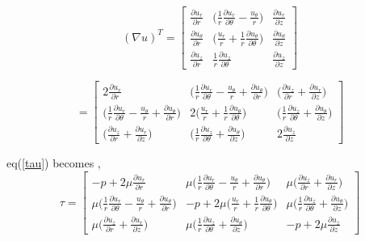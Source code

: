 \documentclass{article}
\begin{document}
\begin{equation}
\label{nablautrans}
(\nabla u)^T =
\begin{bmatrix} 
\frac{\partial u_{r}}{\partial r}   & \bigg(\frac{1}{r}\frac{\partial u_{r}}{\partial \theta} -\frac{u_{\theta}}{r}\bigg) &   \frac{\partial u_{r}}{\partial z}\\
\frac{\partial u_{\theta}}{\partial r} & \bigg(\frac{u_{r}}{r}+\frac{1}{r}\frac{\partial u_{\theta}}{\partial \theta}\bigg)  &       \frac{\partial u_{\theta}}{\partial z}  \\
\frac{\partial u_{z}}{\partial r} & \frac{1}{r}\frac{\partial u_{z}}{\partial \theta}  & \frac{\partial u_{z}}{\partial z}
\end{bmatrix}
\end{equation}

\begin{equation}
[\nabla u + (\nabla u)^T] =
\begin{bmatrix}
2\frac{\partial u_{r}}{\partial r}   &  \bigg(\frac{1}{r}\frac{\partial u_{r}}{\partial \theta} -\frac{u_{\theta}}{r}+\frac{\partial u_{\theta}}{\partial r}\bigg) & \bigg(\frac{\partial u_{z}}{\partial r} + \frac{\partial u_{r}}{\partial z}\bigg) \\
\bigg(\frac{1}{r}\frac{\partial u_{r}}{\partial \theta} -\frac{u_{\theta}}{r}+\frac{\partial u_{\theta}}{\partial r}\bigg) & 2\bigg(\frac{u_{r}}{r}+\frac{1}{r}\frac{\partial u_{\theta}}{\partial \theta}\bigg)  & \bigg(\frac{1}{r}\frac{\partial u_{z}}{\partial \theta} + \frac{\partial u_{\theta}}{\partial z}\bigg) \\
\bigg(\frac{\partial u_{z}}{\partial r} + \frac{\partial u_{r}}{\partial z}\bigg) &  \bigg(\frac{1}{r}\frac{\partial u_{z}}{\partial \theta} + \frac{\partial u_{\theta}}{\partial z}\bigg) & 2\frac{\partial u_{z}}{\partial z}
\end{bmatrix} 
\end{equation}

\therefore eq(\ref{tau}) becomes ,
\begin{equation}
\tau =
\begin{bmatrix}
-p + 2\mu \frac{\partial u_{r}}{\partial r}   &  \mu \bigg(\frac{1}{r}\frac{\partial u_{r}}{\partial \theta} -\frac{u_{\theta}}{r}+\frac{\partial u_{\theta}}{\partial r}\bigg) & \mu \bigg(\frac{\partial u_{z}}{\partial r} + \frac{\partial u_{r}}{\partial z}\bigg) \\
\mu \bigg(\frac{1}{r}\frac{\partial u_{r}}{\partial \theta} -\frac{u_{\theta}}{r}+\frac{\partial u_{\theta}}{\partial r}\bigg) & -p + 2\mu \bigg(\frac{u_{r}}{r}+\frac{1}{r}\frac{\partial u_{\theta}}{\partial \theta}\bigg)  & \mu \bigg(\frac{1}{r}\frac{\partial u_{z}}{\partial \theta} + \frac{\partial u_{\theta}}{\partial z}\bigg) \\
\mu \bigg(\frac{\partial u_{z}}{\partial r} + \frac{\partial u_{r}}{\partial z}\bigg) &  \mu \bigg(\frac{1}{r}\frac{\partial u_{z}}{\partial \theta} + \frac{\partial u_{\theta}}{\partial z}\bigg) & -p + 2\mu \frac{\partial u_{z}}{\partial z}
\end{bmatrix} 
\end{equation}
\end{document}
